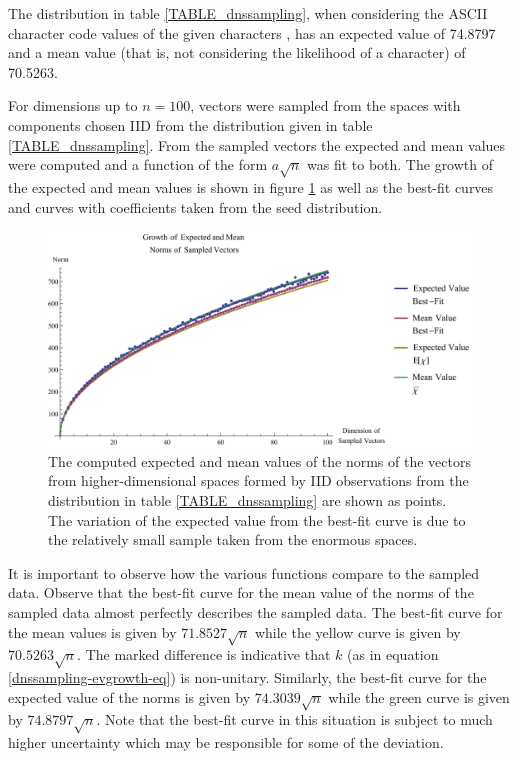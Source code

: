 \documentclass[12pt]{report}
\theoremstyle{remark}
\theoremstyle{definition}
\theoremstyle{definition}
\theoremstyle{definition}
\begin{document}
The distribution in table \ref{TABLE_dnssampling}, when considering the ASCII
character code values of the given characters \cite{asciitable}, has an expected
value of 74.8797 and a mean value (that is, not considering the likelihood of a
character) of 70.5263.

For dimensions up to $n=100$, vectors were sampled from the spaces with
components chosen IID from the distribution given in table
\ref{TABLE_dnssampling}. From the sampled vectors the expected and mean values
were computed and a function of the form $a\sqrt{n}$ was fit to both. The growth
of the expected and mean values is shown in figure \ref{dnssampling-evgrowth} as
well as the best-fit curves and curves with coefficients taken from the seed
distribution.

\begin{figure}
\centering
\includegraphics[width=\textwidth]{figures/dnssampling-ev_growth.pdf}
\caption[Growth of Expected and Mean Norms of Sampled Vectors]{The computed
expected and mean values of the norms of the vectors from higher-dimensional
spaces formed by IID observations from the distribution in table
\ref{TABLE_dnssampling} are shown as points. The variation of the expected value from the best-fit
curve is due to the relatively small sample taken from the enormous spaces.}
\label{dnssampling-evgrowth}
\end{figure}

It is important to observe how the various functions compare to the sampled
data. Observe that the best-fit curve for the mean value of the norms of the
sampled data almost perfectly describes the sampled data. The best-fit curve for
the mean values is given by $71.8527\sqrt{n}$ while the yellow curve is given by
$70.5263\sqrt{n}$. The marked difference is indicative that $k$ (as in equation
\ref{dnssampling-evgrowth-eq}) is non-unitary. Similarly, the best-fit curve for
the expected value of the norms is given by $74.3039\sqrt{n}$ while the green
curve is given by $74.8797\sqrt{n}$. Note that the best-fit curve in this
situation is subject to much higher uncertainty which may be responsible for
some of the deviation.
\end{document}
